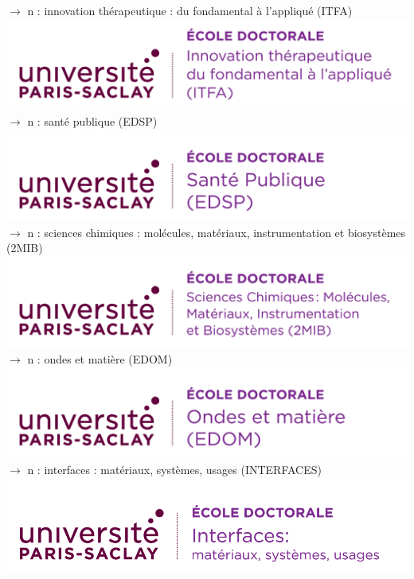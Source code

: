 \documentclass[french,12pt,a4paper]{book}
\begin{document}
\noindent \textbf{\color{Prune}$\rightarrow$} n : innovation thérapeutique : du fondamental à l'appliqué (ITFA)\\    \includegraphics[scale=.7]{logo_usp_ITFA}\\

\noindent \textbf{\color{Prune}$\rightarrow$} n : santé publique (EDSP)\\
\includegraphics[scale=.7]{logo_usp_EDSP}\\

\noindent \textbf{\color{Prune}$\rightarrow$} n : sciences chimiques : molécules, matériaux, instrumentation et biosystèmes (2MIB)\\
\includegraphics[scale=.7]{logo_usp_2MIB}\\

\noindent \textbf{\color{Prune}$\rightarrow$} n : ondes et matière (EDOM)\\
\includegraphics[scale=.7]{logo_usp_EDOM}\\
\newpage
\noindent \textbf{\color{Prune}$\rightarrow$} n : interfaces : matériaux, systèmes, usages (INTERFACES)\\
\includegraphics[scale=.535]{logo_usp_INTERFACES}\\
\end{document}
